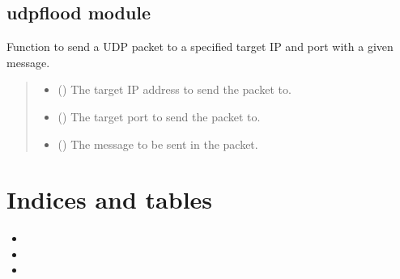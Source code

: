 \documentclass[letterpaper,10pt,english]{sphinxmanual}
\begin{document}
\sphinxstepscope


\section{udpflood module}
\label{\detokenize{udpflood:module-udpflood}}\label{\detokenize{udpflood:udpflood-module}}\label{\detokenize{udpflood::doc}}

\begin{fulllineitems}
\label{\detokenize{udpflood:udpflood.send_packet}}
\pysigstartsignatures
{}
\pysigstopsignatures
\sphinxAtStartPar
Function to send a UDP packet to a specified target IP and port with a given message.
\begin{quote}\begin{description}
\begin{itemize}
\item {} 
\sphinxAtStartPar
{} () \textendash{} The target IP address to send the packet to.

\item {} 
\sphinxAtStartPar
{} () \textendash{} The target port to send the packet to.

\item {} 
\sphinxAtStartPar
{} () \textendash{} The message to be sent in the packet.

\end{itemize}

\end{description}\end{quote}

\end{fulllineitems}



\chapter{Indices and tables}
\label{\detokenize{index:indices-and-tables}}\begin{itemize}
\item {} 
\sphinxAtStartPar
{}

\item {} 
\sphinxAtStartPar
{}

\item {} 
\sphinxAtStartPar
{}

\end{itemize}
\end{document}

